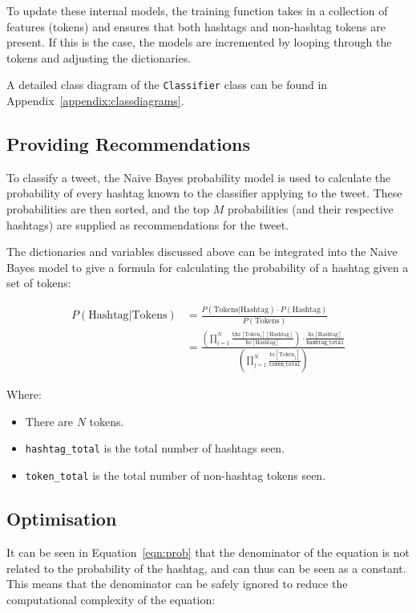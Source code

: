 \documentclass[11pt,a4paper]{report}
\begin{document}
To update these internal models, the training function takes in a collection of features (tokens) and ensures that both hashtags and non-hashtag tokens are present. If this is the case, the models are incremented by looping through the tokens and adjusting the dictionaries.

A detailed class diagram of the \texttt{Classifier} class can be found in Appendix~\ref{appendix:classdiagrams}.

\subsection{Providing Recommendations}
To classify a tweet, the Naive Bayes probability model is used to calculate the probability of every hashtag known to the classifier applying to the tweet. These probabilities are then sorted, and the top $M$ probabilities (and their respective hashtags) are supplied as recommendations for the tweet.

The dictionaries and variables discussed above can be integrated into the Naive Bayes model to give a formula for calculating the probability of a hashtag given a set of tokens:

\begin{align}
    P(\text{Hashtag}|\text{Tokens}) &= \frac{P(\text{Tokens}|\text{Hashtag}) \cdot P(\text{Hashtag})}{P(\text{Tokens})}\\
                                      &= \frac{\left(\prod\limits_{i=1}^{N} \frac{\mathtt{thc}[\text{Token}_i][\text{Hashtag}]}{\mathtt{hc}[\text{Hashtag}]}\right) \cdot \frac{\mathtt{hc}[\text{Hashtag}]}{\mathtt{hashtag\_total}}}{\left(\prod\limits_{j=1}^{N} \frac{\mathtt{tc}[\text{Token}_j]}{\mathtt{token\_total}}\right)}\label{eqn:prob}
\end{align}

Where:
\begin{itemize}
    \item There are $N$ tokens.
    \item \texttt{hashtag\_total} is the total number of hashtags seen.
    \item \texttt{token\_total} is the total number of non-hashtag tokens seen.
\end{itemize}

\subsection{Optimisation}
\label{ssec:optimisation}
It can be seen in Equation~\ref{eqn:prob} that the denominator of the equation is not related to the probability of the hashtag, and can thus can be seen as a constant. This means that the denominator can be safely ignored to reduce the computational complexity of the equation:
\end{document}
